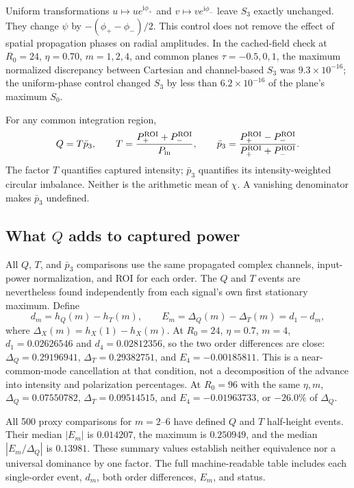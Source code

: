 \documentclass[11pt,a4paper]{article}
\newcommand{\ii}{\mathrm{i}}
\begin{document}
Uniform transformations $u\mapsto ue^{\ii\phi_+}$ and
$v\mapsto ve^{\ii\phi_-}$ leave $S_3$ exactly unchanged. They change
$\psi$ by $-(\phi_+-\phi_-)/2$. This control does not remove the effect of
spatial propagation phases on radial amplitudes. In the cached-field check
at $R_0=24$, $\eta=0.70$, $m=1,2,4$, and common planes
$\tau=-0.5,0,1$, the maximum normalized discrepancy between Cartesian and
channel-based $S_3$ was $9.3\times10^{-16}$; the uniform-phase control changed
$S_3$ by less than $6.2\times10^{-16}$ of the plane's maximum $S_0$.

For any common integration region,
\begin{equation}
Q=T\bar p_3,\qquad
T=\frac{P_+^{\rm ROI}+P_-^{\rm ROI}}{P_{\rm in}},\qquad
\bar p_3=\frac{P_+^{\rm ROI}-P_-^{\rm ROI}}{P_+^{\rm ROI}+P_-^{\rm ROI}}.
\end{equation}
The factor $T$ quantifies captured intensity; $\bar p_3$ quantifies its
intensity-weighted circular imbalance. Neither is the arithmetic mean of
$\chi$. A vanishing denominator makes $\bar p_3$ undefined.

\subsection{What $Q$ adds to captured power}
All $Q$, $T$, and $\bar p_3$ comparisons use the same propagated complex
channels, input-power normalization, and ROI for each order. The $Q$ and
$T$ events are nevertheless found independently from each signal's own
first stationary maximum. Define
\begin{equation}
d_m=h_Q(m)-h_T(m),\qquad
E_m=\Delta_Q(m)-\Delta_T(m)=d_1-d_m,
\end{equation}
where $\Delta_X(m)=h_X(1)-h_X(m)$. At $R_0=24$, $\eta=0.7$,
$m=4$, $d_1=0.02626546$ and $d_4=0.02812356$, so the two order
differences are close: $\Delta_Q=0.29196941$, $\Delta_T=0.29382751$,
and $E_4=-0.00185811$. This is a near-common-mode cancellation at that
condition, not a decomposition of the advance into intensity and
polarization percentages. At $R_0=96$ with the same $\eta,m$,
$\Delta_Q=0.07550782$, $\Delta_T=0.09514515$, and
$E_4=-0.01963733$, or $-26.0\%$ of $\Delta_Q$.

All 500 proxy comparisons for $m=2$--6 have defined $Q$ and $T$
half-height events. Their median $|E_m|$ is $0.014207$, the maximum is
$0.250949$, and the median $|E_m/\Delta_Q|$ is $0.13981$. These summary
values establish neither equivalence nor a universal dominance by one
factor. The full machine-readable table includes each single-order event,
$d_m$, both order differences, $E_m$, and status.
\end{document}
